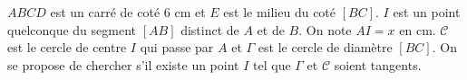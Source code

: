 
$ABCD$ est un carré de coté 6 cm et $E$ est le milieu du coté $[BC]$. $I$ est un point quelconque du segment $[AB]$ distinct de $A$ et de $B$. On note $AI=x$ en cm. $\mathscr{C}$ est le cercle de centre $I$ qui passe par $A$ et $\Gamma$ est le cercle de diamètre $[BC]$.
On se propose de chercher s'il existe un point $I$ tel que $\Gamma$ et $\mathscr{C}$ soient tangents.
